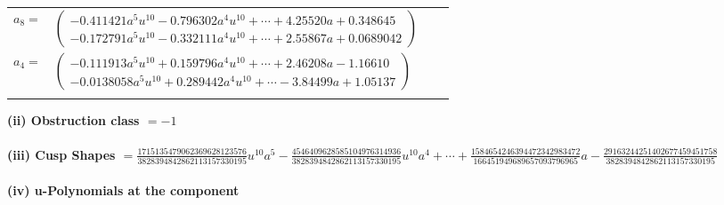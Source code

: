 \documentclass[1p]{elsarticle_modified}
\theoremstyle{definition}
\begin{document}
\begin{tabular}{m{7pt} m{180pt} m{7pt} m{180pt} }
\flushright $a_{8}=$&$\begin{pmatrix}-0.411421 a^{5} u^{10}-0.796302 a^{4} u^{10}+\cdots+4.25520 a+0.348645\\-0.172791 a^{5} u^{10}-0.332111 a^{4} u^{10}+\cdots+2.55867 a+0.0689042\end{pmatrix}$ \\
\flushright $a_{4}=$&$\begin{pmatrix}-0.111913 a^{5} u^{10}+0.159796 a^{4} u^{10}+\cdots+2.46208 a-1.16610\\-0.0138058 a^{5} u^{10}+0.289442 a^{4} u^{10}+\cdots-3.84499 a+1.05137\end{pmatrix}$\\&\end{tabular}
\flushleft \textbf{(ii) Obstruction class $= -1$}\\~\\
\flushleft \textbf{(iii) Cusp Shapes $= \frac{1715135479062369628123576}{3828394842862113157330195} u^{10} a^5-\frac{4546409628585104976314936}{3828394842862113157330195} u^{10} a^4+\cdots+\frac{1584654246394472342983472}{166451949689657093796965} a-\frac{29163244251402677459451758}{3828394842862113157330195}$}\\~\\
\newpage\renewcommand{\arraystretch}{1}
\flushleft \textbf{(iv) u-Polynomials at the component}\newline \\
\end{document}
